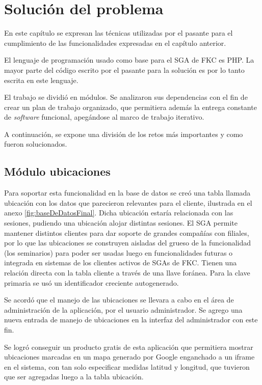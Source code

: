 \chapter{Solución del problema}
\thispagestyle{empty} %

En este capítulo se expresan las técnicas utilizadas por el pasante para el cumplimiento de las funcionalidades expresadas en el capítulo anterior.

El lenguaje de programación usado como base para el \gls{SGA} de \gls{FKC} es \gls{PHP}. La mayor parte del código escrito por el pasante para la solución es por lo tanto escrita en este lenguaje.

El trabajo se dividió en módulos. Se analizaron sus dependencias con el fin de crear un plan de trabajo organizado, que permitiera además la entrega constante de \emph{software} funcional, apegándose al marco de trabajo iterativo.

A continuación, se expone una división de los retos más importantes y como fueron solucionados.

	\section{Módulo ubicaciones} %
	\label{sec:ubicaciones}
	
	Para soportar esta funcionalidad en la base de datos se creó una tabla llamada ubicación con los datos que parecieron relevantes para el cliente, ilustrada en el anexo \ref{fig:baseDeDatosFinal}. Dicha ubicación estaría relacionada con las sesiones, pudiendo una ubicación alojar distintas sesiones. El SGA permite mantener distintos clientes para dar soporte de grandes compañías con filiales, por lo que las ubicaciones se construyen aisladas del grueso de la funcionalidad (los seminarios) para poder ser usadas luego en funcionalidades futuras o integrada en sistemas de los clientes activos de SGAs de \gls{FKC}. Tienen una relación directa con la tabla cliente a través de una llave foránea. Para la clave primaria se usó un identificador creciente autogenerado.

	Se acordó que el manejo de las ubicaciones se llevara a cabo en el área de administración de la aplicación, por el usuario administrador. Se agrego una nueva entrada de manejo de ubicaciones en la interfaz del administrador con este fin.

	Se logró conseguir un producto gratis de esta aplicación que permitiera mostrar ubicaciones marcadas en un mapa generado por Google enganchado a un iframe en el sistema, con tan solo especificar medidas latitud y longitud, que tuvieron que ser agregadas luego a la tabla ubicación.

